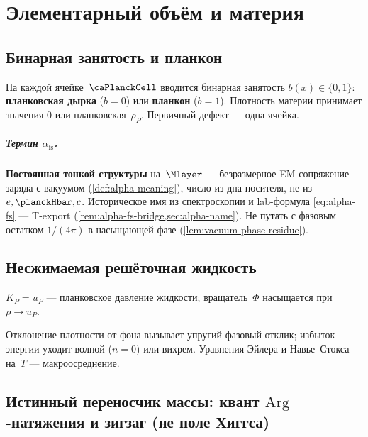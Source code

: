 \chapter{Элементарный объём и материя}
\label{ch:matter}

\section{Бинарная занятость и планкон}
\label{sec:planckon-floor0}

На каждой ячейке~$\PlanckCell$ вводится бинарная занятость $b(x)\in\{0,1\}$:
\textbf{планковская дырка} ($b=0$) или \textbf{планкон} ($b=1$).
Плотность материи принимает значения $0$ или планковская~$\rho_P$.
Первичный дефект --- одна ячейка.

\paragraph{Термин $\alpha_{\mathrm{fs}}$.}
\textbf{Постоянная тонкой структуры} на~$\Mlayer$ --- безразмерное EM-сопряжение заряда с вакуумом
(\cref{def:alpha-meaning}), число из дна носителя, не из $e,\planckHbar,c$.
Историческое имя из спектроскопии и lab-формула \eqref{eq:alpha-fs} --- T-export
(\cref{rem:alpha-fs-bridge,sec:alpha-name}).
Не путать с фазовым остатком $1/(4\pi)$ в насыщающей фазе (\cref{lem:vacuum-phase-residue}).

\section{Несжимаемая решёточная жидкость}

\begin{definition}
\label{def:kp}
$K_P=u_P$ --- планковское давление жидкости;
вращатель~$\Phi$ насыщается при $\rho\to u_P$.
\end{definition}

Отклонение плотности от фона вызывает упругий фазовый отклик;
избыток энергии уходит волной ($n=0$) или вихрем.
Уравнения Эйлера и Навье--Стокса на~$T$ --- макроосреднение.

\section{Истинный переносчик массы: квант \texorpdfstring{$\mathrm{Arg}$}{Arg}-натяжения и зигзаг (не поле Хиггса)}
\label{sec:true-mass-carrier}

